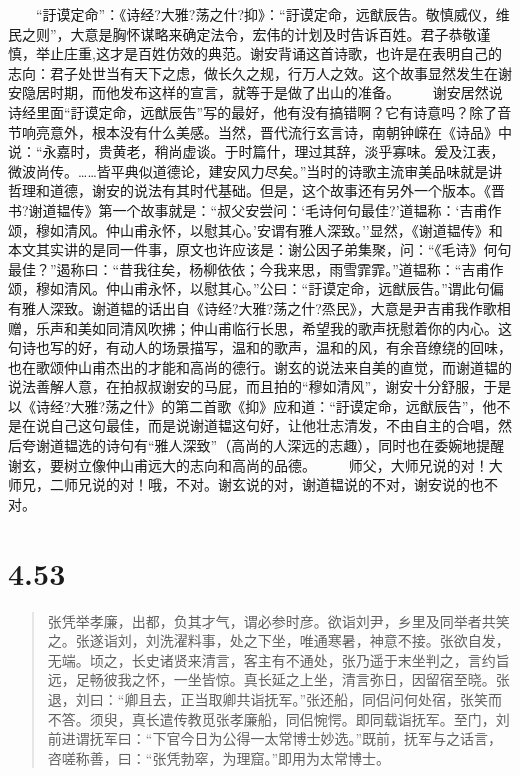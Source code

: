 \documentclass[]{book}
\begin{document}
　　``訏谟定命''：《诗经?大雅?荡之什?抑》：``訏谟定命，远猷辰告。敬慎威仪，维民之则''，大意是胸怀谋略来确定法令，宏伟的计划及时告诉百姓。君子恭敬谨慎，举止庄重,这才是百姓仿效的典范。谢安背诵这首诗歌，也许是在表明自己的志向：君子处世当有天下之虑，做长久之规，行万人之效。这个故事显然发生在谢安隐居时期，而他发布这样的宣言，就等于是做了出山的准备。
　　谢安居然说诗经里面``訏谟定命，远猷辰告''写的最好，他有没有搞错啊？它有诗意吗？除了音节响亮意外，根本没有什么美感。当然，晋代流行玄言诗，南朝钟嵘在《诗品》中说：``永嘉时，贵黄老，稍尚虚谈。于时篇什，理过其辞，淡乎寡味。爰及江表，微波尚传。\ldots{}\ldots{}皆平典似道德论，建安风力尽矣。''当时的诗歌主流审美品味就是讲哲理和道德，谢安的说法有其时代基础。但是，这个故事还有另外一个版本。《晋书?谢道韫传》第一个故事就是：``叔父安尝问：`毛诗何句最佳?'道韫称：`吉甫作颂，穆如清风。仲山甫永怀，以慰其心。'安谓有雅人深致。''显然，《谢道韫传》和本文其实讲的是同一件事，原文也许应该是：谢公因子弟集聚，问：``《毛诗》何句最佳？''遏称曰：``昔我往矣，杨柳依依；今我来思，雨雪霏霏。''道韫称：``吉甫作颂，穆如清风。仲山甫永怀，以慰其心。''公曰：``訏谟定命，远猷辰告。''谓此句偏有雅人深致。谢道韫的话出自《诗经?大雅?荡之什?烝民》，大意是尹吉甫我作歌相赠，乐声和美如同清风吹拂；仲山甫临行长思，希望我的歌声抚慰着你的内心。这句诗也写的好，有动人的场景描写，温和的歌声，温和的风，有余音缭绕的回味，也在歌颂仲山甫杰出的才能和高尚的德行。谢玄的说法来自美的直觉，而谢道韫的说法善解人意，在拍叔叔谢安的马屁，而且拍的``穆如清风''，谢安十分舒服，于是以《诗经?大雅?荡之什》的第二首歌《抑》应和道：``訏谟定命，远猷辰告''，他不是在说自己这句最佳，而是说谢道韫这句好，让他壮志清发，不由自主的合唱，然后夸谢道韫选的诗句有``雅人深致''（高尚的人深远的志趣），同时也在委婉地提醒谢玄，要树立像仲山甫远大的志向和高尚的品德。
　　师父，大师兄说的对！大师兄，二师兄说的对！哦，不对。谢玄说的对，谢道韫说的不对，谢安说的也不对。

\section{4.53}\label{section-231}

\begin{quote}
张凭举孝廉，出都，负其才气，谓必参时彦。欲诣刘尹，乡里及同举者共笑之。张遂诣刘，刘洗濯料事，处之下坐，唯通寒暑，神意不接。张欲自发，无端。顷之，长史诸贤来清言，客主有不通处，张乃遥于末坐判之，言约旨远，足畅彼我之怀，一坐皆惊。真长延之上坐，清言弥日，因留宿至晓。张退，刘曰：``卿且去，正当取卿共诣抚军。''张还船，同侣问何处宿，张笑而不答。须臾，真长遣传教觅张孝廉船，同侣惋愕。即同载诣抚军。至门，刘前进谓抚军曰：``下官今日为公得一太常博士妙选。''既前，抚军与之话言，咨嗟称善，曰：``张凭勃窣，为理窟。''即用为太常博士。
\end{quote}
\end{document}
